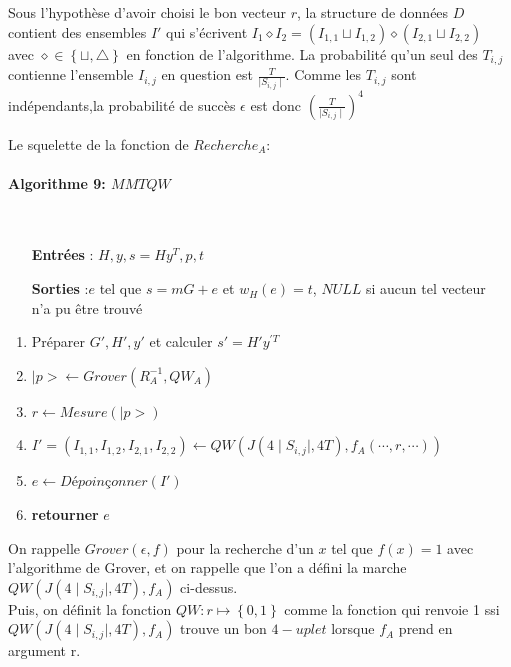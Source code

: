 \documentclass[12pt,openany]{report}
\begin{document}
Sous l'hypothèse d'avoir choisi le bon vecteur $r$, la structure de données $D$ contient des ensembles $ I' $ qui s'écrivent $ I_1 \diamond I_2 =(I_{1,1}\sqcup I_{1,2})\diamond (I_{2,1} \sqcup I_{2,2})$ avec $\diamond \in \left\lbrace \sqcup,\bigtriangleup \right\rbrace   $ en fonction de l'algorithme. La probabilité qu'un seul des $T_{i,j}   $ contienne l'ensemble $ I_{i,j} $ en question est $\frac{T}{\mid S_{i,j} \mid}  $. Comme les $T_{i,j}$ sont indépendants,la probabilité de succès $ \epsilon $ est donc $ \left(\frac{T}{\mid S_{i,j} \mid} \right)^{4}  $


Le squelette de la fonction de $Recherche_A $:
\begin{flushleft}
\begin{boxedminipage}[poslb]{15cm}
\paragraph{Algorithme 9: $MMTQW$ }\cite{Ghazal}\\
\begin{itemize}
\item[\textbf{\textbf{Entrées}}]: $ H,y,s=Hy^{T},p,t $

\item[\textbf{Sorties}]:\hspace{0.2cm}$e$ tel que $s=mG+e $ et $w_H(e)=t$, $NULL  $ si aucun tel vecteur \\ n'a pu être trouvé
\end{itemize}
\begin{enumerate}
\item Préparer $G',H',y' $ et calculer $s'=H'y^{'T}  $
\item $|p>\gets Grover(R_A^{-1},QW_A) $
\item $r \gets Mesure(|p>)  $
\item $I'=(I_{1,1},I_{1,2},I_{2,1},I_{2,2})    \gets QW(J(4\mid S_{i,j} \mid,4T),f_A(\cdots,r,\cdots)) $
\item $ e \gets Dépoinçonner(I') $
\item \textbf{retourner} $e$


\end{enumerate}

\end{boxedminipage}

\end{flushleft}
On rappelle $ Grover(\epsilon,f) $ pour la recherche d'un $x$ tel que $f(x)=1  $ avec l'algorithme de Grover, et on rappelle que l'on a défini la marche $QW(J(4\mid S_{i,j} \mid,4T),f_A)     $ ci-dessus.\\
Puis, on définit la fonction $QW:r\mapsto\left\lbrace 0,1 \right\rbrace    $
comme la fonction qui renvoie 1 ssi $QW(J(4\mid S_{i,j}\mid,4T),f_A)  $ trouve un bon $4-uplet  $ lorsque $f_A  $ prend en argument r.\\
\end{document}
